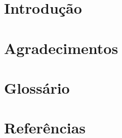 \documentclass[12pt, letterpaper, oneside]{}
\begin{document}
\chapter{Introdução}
\chapter{Agradecimentos}
\chapter{Glossário}
\chapter{Referências}
\end{document}
